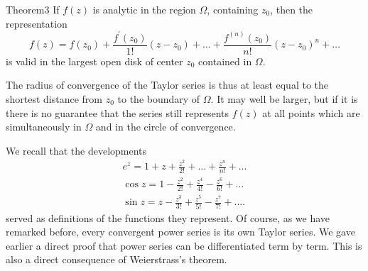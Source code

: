 \begin{originalstatement}{Theorem}{3}\label{thm:5.3}
If $f(z)$ is analytic in the region $\Omega$, containing $z_0$, then the representation
\begin{equation*}
f (z) = f \left(z _ {0}\right) + \frac {f ^ {\prime} \left(z _ {0}\right)}{1 !} \left(z - z _ {0}\right) + \dots + \frac {f ^ {(n)} \left(z _ {0}\right)}{n !} \left(z - z _ {0}\right) ^ {n} + \dots
\end{equation*}
is valid in the largest open disk of center $z_{0}$ contained in $\Omega$.

\end{originalstatement}

The radius of convergence of the Taylor series is thus at least equal to the shortest distance from $z_{0}$ to the boundary of $\Omega$. It may well be larger, but if it is there is no guarantee that the series still represents $f(z)$ at all points which are simultaneously in $\Omega$ and in the circle of convergence.

We recall that the developments
\begin{equation*}
\begin{array}{l} e ^ {z} = 1 + z + \frac {z ^ {2}}{2 !} + \dots + \frac {z ^ {n}}{n !} + \dots \\ \cos z = 1 - \frac {z ^ {2}}{2 !} + \frac {z ^ {4}}{4 !} - \frac {z ^ {6}}{6 !} + \dots \\ \sin z = z - \frac {z ^ {3}}{3 !} + \frac {z ^ {5}}{5 !} - \frac {z ^ {7}}{7 !} + \dots . \end{array}
\end{equation*}
served as definitions of the functions they represent. Of course, as we have remarked before, every convergent power series is its own Taylor series. We gave earlier a direct proof that power series can be differentiated term by term. This is also a direct consequence of Weierstrass's theorem.

